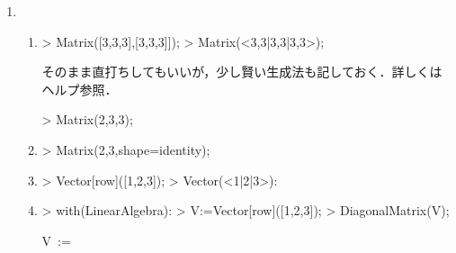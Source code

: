 \begin{enumerate}
\item
\begin{enumerate}
\item
\begin{MapleInput}
> Matrix([3,3,3],[3,3,3]]);
> Matrix(<3,3|3,3|3,3>);
\end{MapleInput}
\begin{MapleOutput}
\displaystyle  {}
\end{MapleOutput}
そのまま直打ちしてもいいが，少し賢い生成法も記しておく．詳しくはヘルプ参照．
\begin{MapleInput}
> Matrix(2,3,3);
\end{MapleInput}
\begin{MapleOutput}
\displaystyle  {}
\end{MapleOutput}

\item
\begin{MapleInput}
> Matrix(2,3,shape=identity);
\end{MapleInput}
\begin{MapleOutput}
\displaystyle  {}
\end{MapleOutput}

\item
\begin{MapleInput}
> Vector[row]([1,2,3]);
> Vector(<1|2|3>):
\end{MapleInput}
\begin{MapleOutput}
\displaystyle  {}
\end{MapleOutput}

\item
\begin{MapleInput}
> with(LinearAlgebra):
> V:=Vector[row]([1,2,3]);
> DiagonalMatrix(V);
\end{MapleInput}
\begin{MapleOutputGather}
\displaystyle V\, := \,  \notag \\
\displaystyle  {} \notag
\end{MapleOutputGather}


\end{enumerate}
\end{enumerate}
